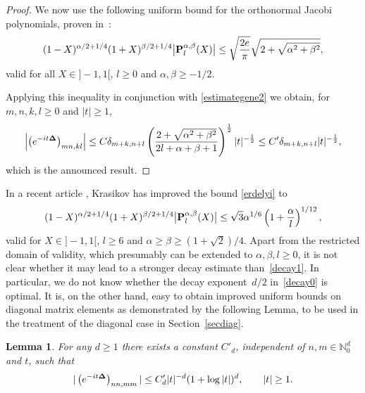 \documentclass[10pt,a4paper]{amsart}
\newtheorem{lemma}{Lemma}
\begin{document}
\begin{proof}
We now use the following uniform bound for the orthonormal Jacobi polynomials,
proven in~\cite{erdel}:
\begin{gather}\label{erdelyi}
(1-X)^{\alpha/2+1/4}
(1+X)^{\beta/2+1/4}\big|{\bf P}_l^{\alpha,\beta}(X)\big| \leq \sqrt{\frac{2 e}{\pi}}\sqrt{2+
\sqrt{\alpha^2+\beta^2}} ,
\end{gather}
valid for all $X\in]-1,1[$, $l\geq 0 $ and
$\alpha, \beta\geq-1/2$.

Applying this inequality in conjunction with \eqref{estimategene2} we
obtain, for $m,n,k,l\geq 0$ and   $|t|\geq 1$,
\begin{gather*}%
\left|\left(e^{-it{\bf\Delta}}\right)_{mn,kl}\right|
 \leq C \delta_{m+k,n+l}
\left(\frac{2+
\sqrt{\alpha^2+\beta^2}}
{2l+\alpha +\beta +1}\right)^{\frac 12}
|t|^{-\frac 12}\leq C' \delta_{m+k,n+l} |t|^{-\frac 12} ,
\end{gather*}
which is the announced result.
\end{proof}

In a recent article \cite{Krasikov}, Krasikov has improved the bound
\eqref{erdelyi} to
\begin{gather*}%
(1-X)^{\alpha/2+1/4}
(1+X)^{\beta/2+1/4}\big|{\bf P}_l^{\alpha,\beta}(X)\big| \leq \sqrt 3
 \alpha^{1/6}\left(1+\frac\alpha l\right)^{1/12} ,
\end{gather*}
valid for $X\in]-1,1[$, $l\geq 6$ and
$\alpha\geq \beta\geq(1+\sqrt2)/4$. Apart from the restricted domain
of validity, which presumably can be extended to $\alpha, \beta, l\geq 0$,
it is not clear whether it may lead to a stronger decay estimate than~\eqref{decay1}. In particular, we do not know whether the decay exponent~$d/2$ in~\eqref{decay0} is optimal.
It is, on the other hand, easy to obtain improved uniform bounds on
diagonal matrix elements as demonstrated by the following
Lemma, to be used in the treatment of the diagonal case in
Section~\ref{secdiag}.

\begin{lemma}
\label{logestimate}
For any $d\geq 1$ there exists a constant $C'_d$, independent of $n,m
\in\mathbb N_0^d$ and
$t$, such that
\begin{gather}\label{decay00}
|\left(e^{-it{\bf\Delta}}\right)_{nn,mm}| \leq  C'_d |t|^{-d}(1+\log
|t|)^d ,\qquad |t|\geq 1 .
\end{gather}
\end{lemma}
\end{document}
